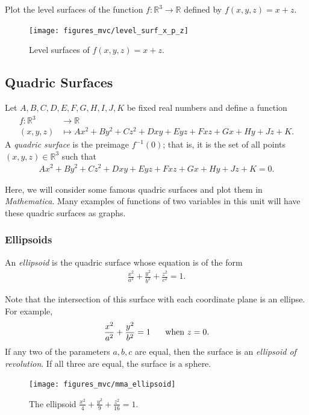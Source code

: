 \documentclass[12pt,letterpaper,reqno]{article}
\numberwithin{equation}{section}
\newcommand{\R}{\ensuremath{\mathbb R}}
\begin{document}
{\begin{exercise}
Plot the level surfaces of the function $f:\R^3 \to \R$ defined by $f(x,y,z)=x+z$.	
\end{exercise}
{\color{red}
\begin{solution}
	\begin{figure}[h]
	\begin{center}
		\texttt{[image: figures\_mvc/level\_surf\_x\_p\_z]}
	\end{center}
	\caption{Level surfaces of $f(x,y,z)=x+z$.}
\end{figure}
\end{solution}}

\subsection{Quadric Surfaces}
\begin{defn}
	Let $A,B,C,D,E,F,G,H,I,J,K$ be fixed real numbers and define a function
	\begin{align*}
		f:\R^3 &\to \R  \\
		(x,y,z)&\mapsto Ax^2+By^2+Cz^2+Dxy+Eyz+Fxz+Gx+Hy+Jz+K.
	\end{align*}
	A \emph{quadric surface} is the preimage $f^{-1}(0)$; that is, it is the set of all points $(x,y,z) \in \R^3$ such that 
	\begin{align*}
		Ax^2+By^2+Cz^2+Dxy+Eyz+Fxz+Gx+Hy+Jz+K=0.
	\end{align*}
\end{defn}
Here, we will consider some famous quadric surfaces and plot them in \emph{Mathematica}. Many examples of functions of two variables in this unit will have these quadric surfaces as graphs.

\subsubsection{Ellipsoids}
\begin{defn}[Ellipsoid]
	An \emph{ellipsoid} is the quadric surface whose equation is of the form
	\begin{align*}
		\frac{x^2}{a^2}+\frac{y^2}{b^2}+\frac{z^2}{c^2}=1.
	\end{align*}
\end{defn}
Note that the intersection of this surface with each coordinate plane is an ellipse. For example,
\begin{align*}
	\frac{x^2}{a^2}+\frac{y^2}{b^2}=1 \hspace{0.5cm} \text{ when } z=0.
\end{align*}
If any two of the parameters $a,b,c$ are equal, then the surface is an \emph{ellipsoid of revolution}. If all three are equal, the surface is a sphere.
\begin{figure}[h]
	\begin{center}
		\texttt{[image: figures\_mvc/mma\_ellipsoid]}
	\end{center}
	\caption{The ellipsoid $\frac{x^2}{4}+\frac{y^2}{9}+\frac{z^2}{16}=1$.}
\end{figure}

}
\end{document}
